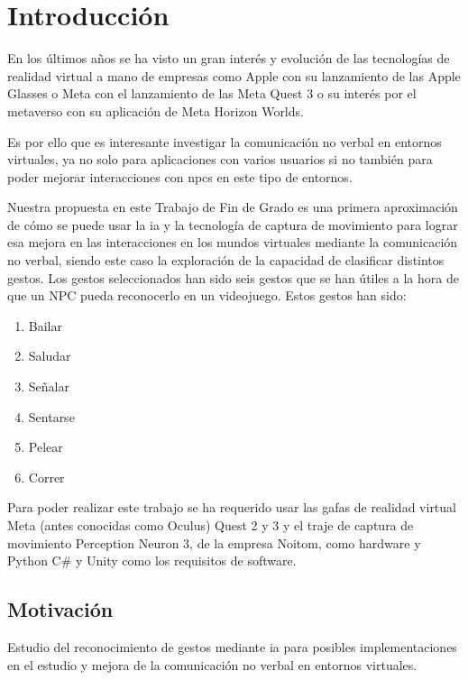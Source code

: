 \chapter{Introducción}
\label{cap:introduccion}


En los últimos años se ha visto un gran interés y evolución de las tecnologías de realidad virtual a mano de empresas como Apple con su lanzamiento de las Apple Glasses o Meta con el lanzamiento de las Meta Quest 3 o su interés por el \gls{metaverso} con su aplicación de Meta Horizon Worlds.

Es por ello que es interesante investigar la comunicación no verbal en entornos virtuales, ya no solo para aplicaciones con varios usuarios si no también para poder mejorar interacciones con \glspl{npc} en este tipo de entornos.

Nuestra propuesta en este Trabajo de Fin de Grado es una primera aproximación de cómo se puede usar la \gls{ia} y la tecnología de captura de movimiento para lograr esa mejora en las interacciones en los mundos virtuales mediante la comunicación no verbal, siendo este caso la exploración de la capacidad de clasificar distintos gestos.
Los gestos seleccionados han sido seis gestos que se han útiles a la hora de que un NPC pueda reconocerlo en un videojuego. Estos gestos han sido:
\begin{enumerate}
	\item Bailar
	\item Saludar
	\item Señalar
	\item Sentarse
	\item Pelear
	\item Correr
\end{enumerate}

Para poder realizar este trabajo se ha requerido usar las gafas de realidad virtual Meta (antes conocidas como Oculus) Quest 2 y 3 y el traje de captura de movimiento Perception Neuron 3, de la empresa Noitom, como hardware y Python C\# y Unity como los requisitos de software.
\section{Motivación}
Estudio del reconocimiento de gestos mediante \gls{ia} para posibles implementaciones en el estudio y mejora de la comunicación no verbal en entornos virtuales.

